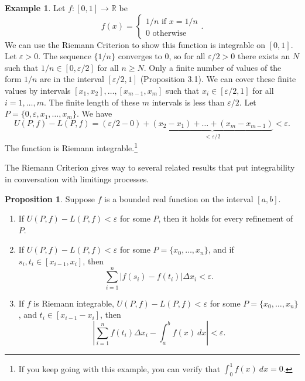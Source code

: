 \documentclass{article}
\newcommand{\R}{\mathbb{R}}
\theoremstyle{definition}
\newtheorem{proposition}{Proposition}[section]
\newtheorem{example}{Example}[section]
\begin{document}
\begin{example}
Let $ f:[0,1]\to \R $ be $$f(x)=\begin{cases}
1/n\text{ if }x=1/n\\0\text{ otherwise}
\end{cases}. $$ We can use the Riemann Criterion to show this function is integrable on $ [0,1] $. Let $ \varepsilon>0 $. The sequence $ \{1/n\} $ converges to $ 0 $, so for all $ \varepsilon/2>0 $ there exists an $ N $ such that $ 1/n\in[0,\varepsilon/2] $ for all $ n\ge N $. Only a finite number of values of the form $ 1/n $ are in the interval $ [\varepsilon/2,1] $ (Proposition 3.1). We can cover these finite values by intervals $ [x_1,x_2],\ldots,[x_{m-1},x_m] $ such that $ x_i\in[\varepsilon/2,1] $ for all $ i=1,\ldots,m $. The finite length of these $ m $ intervals is less than $ \varepsilon/2 $. Let $ P=\{0,\varepsilon,x_1,\ldots,x_m\} $. We have $$U(P,f)-L(P,f)=(\varepsilon/2-0)+\underbrace{(x_2-x_1)+\ldots+(x_m-x_{m-1}) }_{<\varepsilon/2}<\varepsilon.$$ The function is Riemann integrable.\footnote{If you keep going with this example, you can verify that $ \int_{0}^{1}f(x)\ dx=0 $.} 
\end{example}
The Riemann Criterion gives way to several related results that put integrability in conversation with limitings processes. 
\begin{proposition}
	Suppose $ f $ is a bounded real function on the interval $ [a,b] $.
	\begin{enumerate}
	\item If $ U(P,f)-L(P,f)<\varepsilon $ for some $ P $, then it holds for every refinement of $ P $.
	\item If $ U(P,f)-L(P,f)<\varepsilon $ for some $ P=\{x_0,\ldots,x_n\} $, and if $ s_i,t_i\in[x_{i-1},x_{i}] $, then $$ \sum_{i=1}^n|f(s_i)-f(t_i)|\Delta x_i<\varepsilon.$$
	\item If $ f $ is Riemann integrable, $ U(P,f)-L(P,f)<\varepsilon $ for some $ P=\{x_0,\ldots,x_n\} $, and $ t_i\in[x_{i-1}-x_{i}]$, then $$ \left\lvert \sum_{i=1}^nf(t_i)\Delta x_i-\int_{a}^{b}f(x)\ dx\right\rvert<\varepsilon.$$
	\end{enumerate}
\end{proposition}
\end{document}
